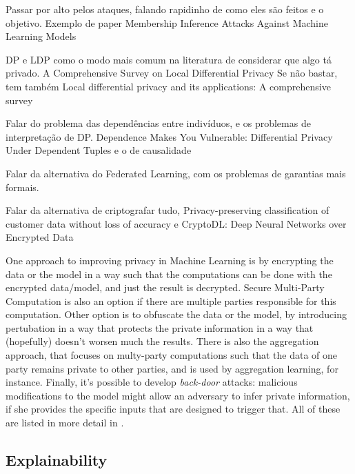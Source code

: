 {\color{red} Passar por alto pelos ataques, falando rapidinho de como eles são feitos e o objetivo. Exemplo de paper Membership Inference Attacks Against Machine Learning Models}

{\color{red} DP e LDP como o modo mais comum na literatura de considerar que algo tá privado. A Comprehensive Survey on Local Differential Privacy Se não bastar, tem também Local differential privacy and its applications: A comprehensive survey}

{\color{red} Falar do problema das dependências entre indivíduos, e os problemas de interpretação de DP. Dependence Makes You Vulnerable: Differential Privacy Under Dependent Tuples e o de causalidade}

{\color{red} Falar da alternativa do Federated Learning, com os problemas de garantias mais formais.}

{\color{red} Falar da alternativa de criptografar tudo, Privacy-preserving classification of customer data without loss of accuracy e CryptoDL: Deep Neural Networks over Encrypted Data}


One approach to improving privacy in Machine Learning is by encrypting the data or the model in a way such that the computations can be done with the encrypted data/model, and just the result is decrypted. Secure Multi-Party Computation is also an option if there are multiple parties responsible for this computation. Other option is to obfuscate the data or the model, by introducing pertubation in a way that protects the private information in a way that (hopefully) doesn't worsen much the results. There is also the aggregation approach, that focuses on multy-party computations such that the data of one party remains private to other parties, and is used by aggregation learning, for instance. Finally, it's possible to develop \emph{back-door} attacks: malicious modifications to the model might allow an adversary to infer private information, if she provides the specific inputs that are designed to trigger that. All of these are listed in more detail in \cite{liu2021machine}.


\subsection{Explainability}


